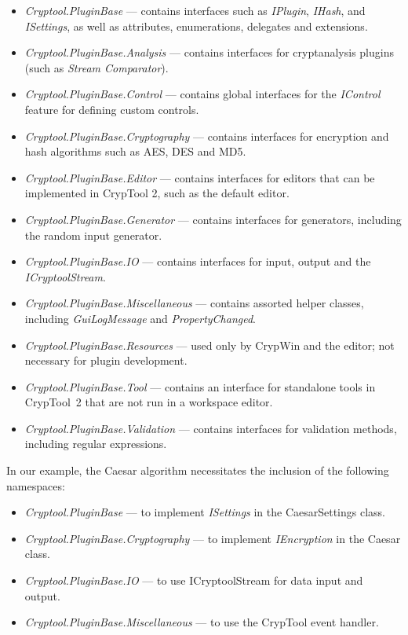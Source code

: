 \begin{itemize}
	\item \textit{Cryptool.PluginBase} --- contains interfaces such as \textit{IPlugin}, \textit{IHash}, and \textit{ISettings}, as well as attributes, enumerations, delegates and extensions.
	\item \textit{Cryptool.PluginBase.Analysis} --- contains interfaces for cryptanalysis plugins (such as \textit{Stream Comparator}).
	\item \textit{Cryptool.PluginBase.Control} --- contains global interfaces for the \textit{IControl} feature for defining custom controls.
	\item \textit{Cryptool.PluginBase.Cryptography} --- contains interfaces for encryption and hash algorithms such as AES, DES and MD5.
	\item \textit{Cryptool.PluginBase.Editor} --- contains interfaces for editors that can be implemented in CrypTool 2, such as the default editor.
	\item \textit{Cryptool.PluginBase.Generator} --- contains interfaces for generators, including the random input generator.
	\item \textit{Cryptool.PluginBase.IO} --- contains interfaces for input, output and the \textit{ICryptoolStream}.
	\item \textit{Cryptool.PluginBase.Miscellaneous} --- contains assorted helper classes, including \textit{GuiLogMessage} and \textit{PropertyChanged}.
	\item \textit{Cryptool.PluginBase.Resources} --- used only by CrypWin and the editor; not necessary for plugin development.
	\item \textit{Cryptool.PluginBase.Tool} --- contains an interface for standalone tools in CrypTool~2 that are not run in a workspace editor.
	\item \textit{Cryptool.PluginBase.Validation} --- contains interfaces for validation methods, including regular expressions.
\end{itemize}

\noindent In our example, the Caesar algorithm necessitates the inclusion of the following namespaces:

\begin{itemize}
	\item \textit{Cryptool.PluginBase} --- to implement \textit{ISettings} in the CaesarSettings class.
	\item \textit{Cryptool.PluginBase.Cryptography} --- to implement \textit{IEncryption} in the Caesar class.
	\item \textit{Cryptool.PluginBase.IO} --- to use ICryptoolStream for data input and output.
	\item \textit{Cryptool.PluginBase.Miscellaneous} --- to use the CrypTool event handler.
\end{itemize}

